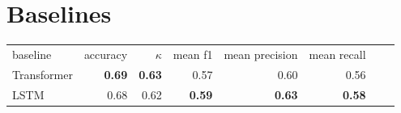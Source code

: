 \documentclass[a0]{tumposter}
\begin{document}
\begin{minipage}[t]{0.65\textwidth}

\section{Baselines}

\begin{tabular}{lrrrrrrr}
	\toprule
	baseline & accuracy & $\kappa$ & mean f1 & mean precision  & mean recall \\
	\cmidrule(lr){1-1}\cmidrule(lr){2-2}\cmidrule(lr){3-3}\cmidrule(lr){4-4}\cmidrule(lr){5-5}\cmidrule(lr){6-6}\cmidrule(lr){7-7}
	Transformer & \textbf{0.69}  &  \textbf{0.63} & 0.57 & {0.60} & 0.56 \\
	LSTM & 0.68 & 0.62 & \textbf{0.59} & \textbf{0.63} & \textbf{0.58} \\
	\bottomrule
\end{tabular}

\end{minipage}
\hfill
\end{document}
